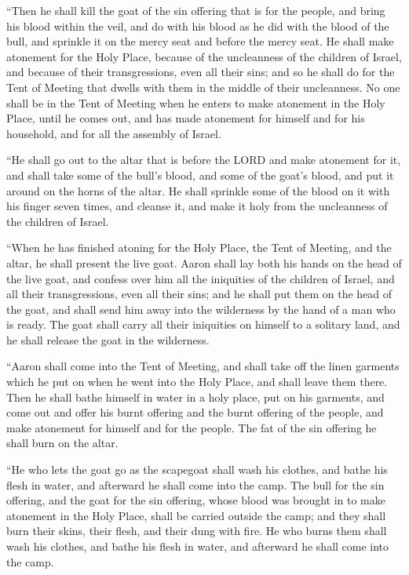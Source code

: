  ``Then he shall kill the goat of the sin offering that is
for the people, and bring his blood within the veil, and do with his
blood as he did with the blood of the bull, and sprinkle it on the mercy
seat and before the mercy seat.  He shall make atonement
for the Holy Place, because of the uncleanness of the children of
Israel, and because of their transgressions, even all their sins; and so
he shall do for the Tent of Meeting that dwells with them in the middle
of their uncleanness.  No one shall be in the Tent of
Meeting when he enters to make atonement in the Holy Place, until he
comes out, and has made atonement for himself and for his household, and
for all the assembly of Israel.

 ``He shall go out to the altar that is before the LORD and
make atonement for it, and shall take some of the bull's blood, and some
of the goat's blood, and put it around on the horns of the altar.
 He shall sprinkle some of the blood on it with his finger
seven times, and cleanse it, and make it holy from the uncleanness of
the children of Israel.

 ``When he has finished atoning for the Holy Place, the
Tent of Meeting, and the altar, he shall present the live goat.
 Aaron shall lay both his hands on the head of the live
goat, and confess over him all the iniquities of the children of Israel,
and all their transgressions, even all their sins; and he shall put them
on the head of the goat, and shall send him away into the wilderness by
the hand of a man who is ready.  The goat shall carry all
their iniquities on himself to a solitary land, and he shall release the
goat in the wilderness.

 ``Aaron shall come into the Tent of Meeting, and shall
take off the linen garments which he put on when he went into the Holy
Place, and shall leave them there.  Then he shall bathe
himself in water in a holy place, put on his garments, and come out and
offer his burnt offering and the burnt offering of the people, and make
atonement for himself and for the people.  The fat of the
sin offering he shall burn on the altar.

 ``He who lets the goat go as the scapegoat shall wash his
clothes, and bathe his flesh in water, and afterward he shall come into
the camp.  The bull for the sin offering, and the goat for
the sin offering, whose blood was brought in to make atonement in the
Holy Place, shall be carried outside the camp; and they shall burn their
skins, their flesh, and their dung with fire.  He who burns
them shall wash his clothes, and bathe his flesh in water, and afterward
he shall come into the camp.

